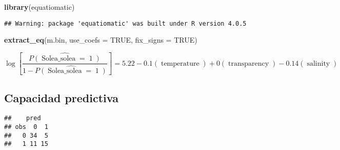 \documentclass[
]{book}
\newenvironment{Shaded}{\begin{snugshade}}{\end{snugshade}}
\newcommand{\CommentTok}[1]{\textcolor[rgb]{0.56,0.35,0.01}{\textit{#1}}}
\newcommand{\DataTypeTok}[1]{\textcolor[rgb]{0.13,0.29,0.53}{#1}}
\newcommand{\DecValTok}[1]{\textcolor[rgb]{0.00,0.00,0.81}{#1}}
\newcommand{\FloatTok}[1]{\textcolor[rgb]{0.00,0.00,0.81}{#1}}
\newcommand{\KeywordTok}[1]{\textcolor[rgb]{0.13,0.29,0.53}{\textbf{#1}}}
\newcommand{\NormalTok}[1]{#1}
\newcommand{\OperatorTok}[1]{\textcolor[rgb]{0.81,0.36,0.00}{\textbf{#1}}}
\newcommand{\OtherTok}[1]{\textcolor[rgb]{0.56,0.35,0.01}{#1}}
\newcommand{\StringTok}[1]{\textcolor[rgb]{0.31,0.60,0.02}{#1}}
\begin{document}
\begin{Shaded}
\begin{Highlighting}[]
\KeywordTok{library}\NormalTok{(equatiomatic)}
\end{Highlighting}
\end{Shaded}

\begin{verbatim}
## Warning: package 'equatiomatic' was built under R version 4.0.5
\end{verbatim}

\begin{Shaded}
\begin{Highlighting}[]
\KeywordTok{extract_eq}\NormalTok{(m.bin, }\DataTypeTok{use_coefs =} \OtherTok{TRUE}\NormalTok{, }\DataTypeTok{fix_signs =} \OtherTok{TRUE}\NormalTok{)}
\end{Highlighting}
\end{Shaded}

\begin{equation}
\log\left[ \frac { \widehat{P( \operatorname{Solea\_solea} = \operatorname{1} )} }{ 1 - \widehat{P( \operatorname{Solea\_solea} = \operatorname{1} )} } \right] = 5.22 - 0.1(\operatorname{temperature}) + 0(\operatorname{transparency}) - 0.14(\operatorname{salinity})
\end{equation}

\hypertarget{capacidad-predictiva}{%
\subsection{Capacidad predictiva}\label{capacidad-predictiva}}

\begin{Shaded}
\end{Shaded}

\begin{verbatim}
##    pred
## obs  0  1
##   0 34  5
##   1 11 15
\end{verbatim}
\end{document}
